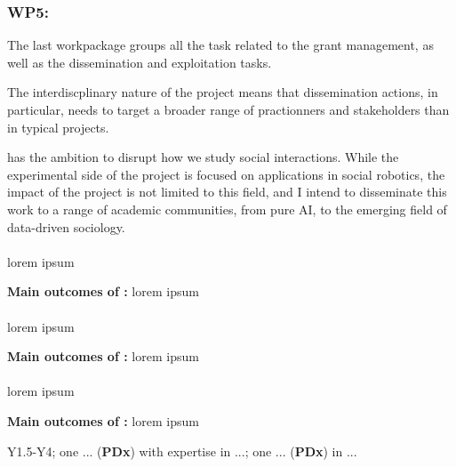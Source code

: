 \subsubsection{WP5: \textbf{\WPZ}}

The last workpackage groups all the task related to the grant management, as
well as the dissemination and exploitation tasks.

The interdiscplinary nature of the project means that dissemination actions, in
particular, needs to target a broader range of practionners and stakeholders
than in typical projects.

\project has the ambition to disrupt how we study social interactions. While the
experimental side of the project is focused on applications in social robotics,
the impact of the project is not limited to this field, and I intend to
disseminate this work to a range of academic communities, from pure AI, to the
emerging field of data-driven sociology.


\paragraph{\TZA}

lorem ipsum

\begin{framed}
    {\noindent\bf Main outcomes of \tZA:} lorem ipsum 
\end{framed}

\paragraph{\TZB}

lorem ipsum

\begin{framed}
    {\noindent\bf Main outcomes of \tZB:} lorem ipsum 
\end{framed}

\paragraph{\TZC}

lorem ipsum

\begin{framed}
    {\noindent\bf Main outcomes of \tZC:} lorem ipsum 
\end{framed}


\begin{framed}
     Y1.5-Y4; one ... ({\bf PDx}) with expertise in
    ...; one ... ({\bf PDx}) in ...
\end{framed}


